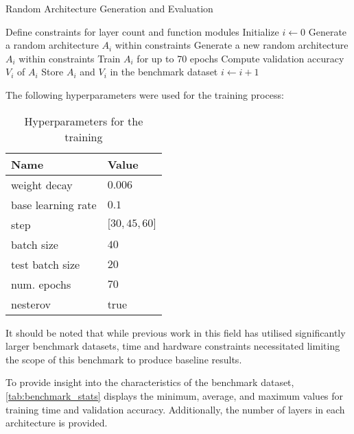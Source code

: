 \begin{algorithm}
\caption{Random Architecture Generation and Evaluation}
\label{alg:random_arch_gen_eval}
\begin{algorithmic}[1]
\State Define constraints for layer count and function modules
\State Initialize $i \gets 0$
    \State Generate a random architecture $A_i$ within constraints
        \State Generate a new random architecture $A_i$ within constraints
    \EndWhile
    \State Train $A_i$ for up to 70 epochs
    \State Compute validation accuracy $V_i$ of $A_i$
    \State Store $A_i$ and $V_i$ in the benchmark dataset
    \State $i \gets i + 1$
\EndWhile
\end{algorithmic}
\end{algorithm}


\clearpage
The following hyperparameters were used for the training process: 

\begin{table}[h]
\centering
\caption{Hyperparameters for the training}
\begin{tabular}{ll}
\textbf{Name}                           & \textbf{Value}   \\ \hline
\multicolumn{1}{l|}{weight decay}       & $0.006$          \\
\multicolumn{1}{l|}{\cellcolor{verylightgray}base learning rate} & \cellcolor{verylightgray}$0.1$              \\
\multicolumn{1}{l|}{step}               & ${[}30, 45, 60{]}$ \\
\multicolumn{1}{l|}{\cellcolor{verylightgray}batch size}         & \cellcolor{verylightgray}$40$               \\
\multicolumn{1}{l|}{test batch size}    & $20$               \\
\multicolumn{1}{l|}{\cellcolor{verylightgray}num. epochs}        & \cellcolor{verylightgray}$70$               \\
\multicolumn{1}{l|}{nesterov}           & true            
\end{tabular}
\end{table}

It should be noted that while previous work in this field has utilised significantly larger benchmark datasets, time and hardware constraints necessitated limiting the scope of this benchmark to produce baseline results.

To provide insight into the characteristics of the benchmark dataset, \cref{tab:benchmark_stats} displays the minimum, average, and maximum values for training time and validation accuracy. Additionally, the number of layers in each architecture is provided.

